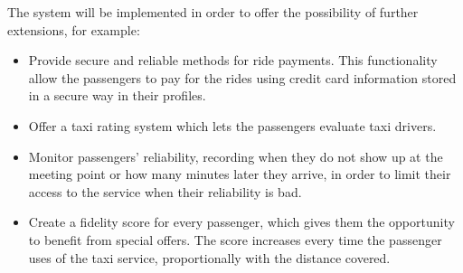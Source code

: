 The system will be implemented in order to offer the possibility of further extensions, for example:

\begin{itemize}
\item Provide secure and reliable methods for ride payments. This functionality allow the passengers to pay for the rides using credit card information stored in a secure way in their profiles.
\item Offer a taxi rating system which lets the passengers evaluate taxi drivers.
\item Monitor passengers' reliability, recording when they do not show up at the meeting point or how many minutes later they arrive, in order to limit their access to the service when their reliability is bad.
\item Create a fidelity score for every passenger, which gives them the opportunity to benefit from special offers. The score increases every time the passenger uses of the taxi service, proportionally with the distance covered.
\end{itemize}
